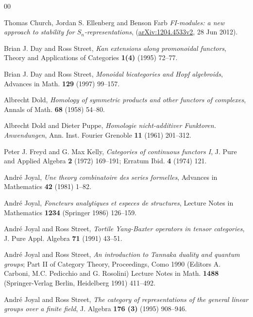 \documentclass[a4paper,12pt,reqno]{amsart}
\theoremstyle{definition}
\theoremstyle{fact}
\theoremstyle{genquest}
\theoremstyle{step}
\begin{document}
\begin{thebibliography}{00}

 Thomas Church, Jordan S. Ellenberg and Benson Farb \textit{FI-modules: a new approach to stability for $S_n$-representations}, (\url{arXiv:1204.4533v2}, 28 Jun 2012).\label{CEF2012}

 Brian J. Day and Ross Street, \textit{Kan extensions along promonoidal functors}, Theory and Applications of Categories \textbf{1(4)} (1995) 72--77. \label{DaySt1995} 

 Brian J. Day and Ross Street, \textit{Monoidal bicategories and Hopf algebroids}, Advances in Math. \textbf{129} (1997) 99--157. \label{DaySt1997}

 Albrecht Dold, \textit{Homology of symmetric products and other functors of complexes}, Annals of Math. \textbf{68} (1958) 54--80.\label{Dold}
 
 Albrecht Dold and Dieter Puppe, \textit{Homologie nicht-additiver Funktoren. Anwendungen}, Ann. Inst. Fourier Grenoble \textbf{11} (1961) 201--312.\label{DoldPuppe}

 Peter J. Freyd and G. Max Kelly, \textit{Categories of continuous functors I}, J. Pure and Applied Algebra \textbf{2} (1972) 169--191; Erratum Ibid. \textbf{4} (1974) 121.\label{FreydKelly}

 Andr\'e Joyal, \textit{Une theory combinatoire des series formelles}, Advances in Mathematics \textbf{42} (1981) 1--82.\label{Species}

 Andr\'e Joyal, \textit{Foncteurs analytiques et especes de structures}, Lecture Notes in Mathematics \textbf{1234} (Springer 1986) 126--159.\label{AnalFunct} 

 Andr\'e Joyal and Ross Street, \textit{Tortile Yang-Baxter operators in tensor categories}, J. Pure Appl. Algebra \textbf{71} (1991) 43--51.\label{TYBO}

 Andr\'e Joyal and Ross Street, \textit{An introduction to Tannaka duality and quantum groups}; Part II of Category Theory, Proceedings, Como 1990 (Editors A. Carboni, M.C. Pedicchio and G. Rosolini) Lecture Notes in Math. \textbf{1488} (Springer-Verlag Berlin, Heidelberg 1991) 411--492.\label{ITD&QG}

 Andr\'e Joyal and Ross Street, \textit{The category of representations of the general linear groups over a finite field}, J. Algebra \textbf{176 (3)} (1995) 908--946.\label{repfgl}


\end{thebibliography}
\end{document}
